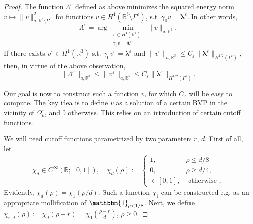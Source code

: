 \documentclass[10pt,a4paper]{amsart}
\newcommand{\re}{\varepsilon}
\renewcommand{\vec}{\boldsymbol}
\begin{document}
		\begin{proof}
			The function $\Lambda^{\re}$ defined as above minimizes the squared energy norm $v\mapsto \|v\|^2_{a,\mathbb{R}^3\setminus\Gamma^{\re}}$ for functions $v\in H^1(\mathbb{R}^3\setminus\Gamma^{\re})$, s.t. $\gamma_0 v=\vec{\lambda}^{\re}$. In other words, 
			\[\Lambda^{\re} = \arg\min_{\substack{v \in H^1(\mathbb{R}^3): \\ \gamma_0 v = \boldsymbol{\Lambda}^{\re}}}\| v \|_{a, \mathbb{R}^3}.\]
			If there exists $v^{\re}\in H^1(\mathbb{R}^3)$ s.t. $\gamma_0 v^{\re}=\vec{\lambda}^{\re}$ and  $\|v^{\re}\|_{a,\mathbb{R}^3}\leq C_{\re}\|\vec{\lambda}^{\re}\|_{H^{1/2}(\Gamma^{\re})}$, then, in virtue of the above observation, 
			\begin{equation}
				\label{eq:lambadre}
				\| \Lambda^{\re} \|_{a, \mathbb{R}^3} \leq \| v^{\re} \|_{a,\mathbb{R}^3} \leq C_{\re} \| \vec{\lambda}^{\re} \|_{H^{1/2}(\Gamma^{\re})}.
			\end{equation}
			
			Our goal is now to construct such a function $v$, for which $C_{\re}$ will be easy to compute. The key idea is to define $v$ as a solution of a certain BVP in the vicinity of $\Omega_k^{\re}$, and $0$ otherwise. This relies on an introduction of certain cutoff functions. 
			
			We will need cutoff functions parametrized by two parameters $r, \, d$. First of all, let  
			\begin{align*}%
				\chi_{d}\in C^{\infty}(\mathbb{R}; [0,1]), \quad	\chi_{d}(\rho):=\left\{
				\begin{array}{ll}
					1, & \rho\leq d/8\\
					0, & \rho\geq d/4,\\
					\in [0,1], &\text{ otherwise },
				\end{array}	
				\right.
			\end{align*}
			Evidently, $\chi_d(\rho)=\chi_1(\rho/d)$. Such a function $\chi_1$ can be constructed e.g. as an appropriate mollification of $\mathbbm{1}_{\rho<1/8}$. 
			Next, we define $\chi_{r,d}(\rho):=\chi_d(\rho-r)=\chi_1(\frac{\rho-r}{d})$, $\rho\geq 0$. 
			

\end{proof}
\end{document}
